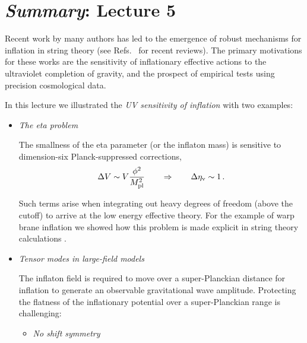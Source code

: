 \documentclass[12pt,letterpaper,rotate]{article}
\def\beq{\begin{equation}}
\def\eeq{\end{equation}}
\def\Mp{M_{\rm pl}}
\begin{document}
{%







\newpage
\section{{\sl Summary}: Lecture 5}

\vskip 10pt
Recent work by many authors has led to the emergence of robust mechanisms for inflation in string theory (see Refs.~\cite{BMReview, Burgess:2007pz, Kallosh:2007ig, Linde:2005dd, McAllister:2007bg, Cline:2006hu} for recent reviews).  The primary
motivations for these works are the sensitivity of inflationary effective actions to the ultraviolet completion of gravity, and the prospect of empirical tests using precision cosmological data.  

In this lecture we illustrated the {\it UV sensitivity of inflation} with two examples:

\begin{itemize}
\item {\it The eta problem}

The smallness of the eta parameter (or the inflaton mass) is sensitive to dimension-six Planck-suppressed corrections,
\beq
\Delta V \sim V \frac{\phi^2}{\Mp^2} \qquad \Rightarrow \qquad \Delta \eta_{\rm v} \sim 1\, . \nonumber
\eeq

Such terms arise when integrating out heavy degrees of freedom (above the cutoff) to arrive at the low energy effective theory.
For the example of warp brane inflation we showed how this problem is made explicit in string theory calculations \cite{Baumann:2006th, Baumann:2007ah, Baumann:2008kq, BaumannProgress}.

\item {\it Tensor modes in large-field models}

The inflaton field is required to move over a super-Planckian distance for inflation to generate an observable gravitational wave amplitude.
Protecting the flatness of the inflationary potential over a super-Planckian range is challenging:
\begin{itemize}
\item {\it No shift symmetry}


\end{itemize}
\end{itemize}}
\end{document}

